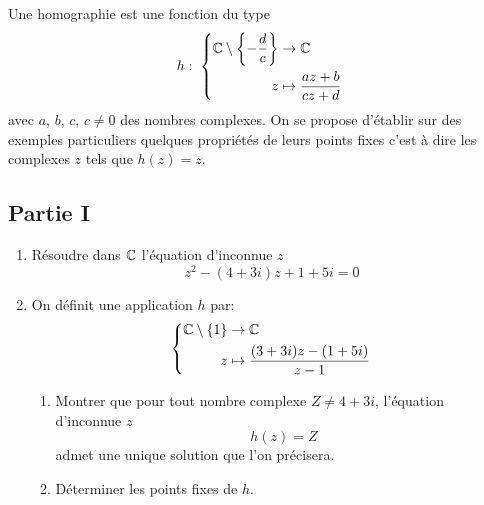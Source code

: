 Une homographie est une fonction du type
\begin{displaymath}
h:\;  \left\lbrace 
  \begin{aligned}
    \mathbb{C}\setminus\left\lbrace -\frac{d}{c}\right\rbrace &\rightarrow \mathbb{C} \\
     z &\mapsto \frac{az + b}{cz + d}
  \end{aligned}
\right. 
\end{displaymath}
avec $a$, $b$, $c$, $c\neq 0$ des nombres complexes. On se propose d'établir sur des exemples particuliers quelques propriétés de leurs points fixes c'est à dire les complexes $z$ tels que $h(z) = z$.
\subsection*{Partie I}
\begin{enumerate}
  \item Résoudre dans $\mathbb{C}$ l'équation d'inconnue $z$
\begin{displaymath}
  z^2 -(4+3i)z + 1 + 5i = 0
\end{displaymath}
   \item On définit une application $h$ par:
\begin{displaymath}
  \left\lbrace 
  \begin{aligned}
    \mathbb{C}\setminus\left\lbrace 1\right\rbrace &\rightarrow \mathbb{C} \\
     z &\mapsto \frac{(3+3i)z -(1+5i)}{z-1}
  \end{aligned}
\right. 
\end{displaymath}
\begin{enumerate}
  \item Montrer que pour tout nombre complexe $Z\neq 4+3i$, l'équation d'inconnue $z$
  \begin{displaymath}
    h(z) = Z
  \end{displaymath}
admet une unique solution que l'on précisera.

\item Déterminer les points fixes de $h$.
\end{enumerate}
\end{enumerate}

